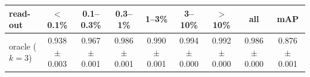 \begin{tabular}{lcccccccc}
\toprule
read-out & $<$0.1\% & 0.1--0.3\% & 0.3--1\% & 1--3\% & 3--10\% & $>$10\% & all & mAP \\
\midrule
oracle ($k=3$) & 0.938 $\pm$ 0.003 & 0.967 $\pm$ 0.001 & 0.986 $\pm$ 0.001 & 0.990 $\pm$ 0.001 & 0.994 $\pm$ 0.000 & 0.992 $\pm$ 0.000 & 0.986 $\pm$ 0.000 & 0.876 $\pm$ 0.001 \\
\bottomrule
\end{tabular}
